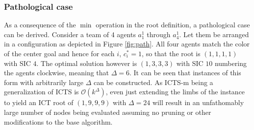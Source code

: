 \documentclass[english]{article}
\begin{document}
	\subsubsection{Pathological case}
	\label{pathology}
	As a consequence of the $\min$ operation in the root definition, a pathological case can be derived. Consider a team of 4 agents $a_1^1$ through $a_4^1$. Let them be arranged in a configuration as depicted in Figure \ref{fig:path}. All four agents match the color of the center goal and hence for each $i$, $c^*_i = 1$, so that the root is $(1,1,1,1)$ with SIC $4$. The optimal solution however is $(1,3,3,3)$ with SIC $10$ numbering the agents clockwise, meaning that $\Delta = 6$. It can be seen that instances of this form with arbitrarily large $\Delta$ can be constructed. As ICTS-m being a generalization of ICTS is $\mathcal{O}(k^\Delta)$, even just extending the limbs of the instance to yield an ICT root of $(1,9,9,9)$ with $\Delta = 24$ will result in an unfathomably large number of nodes being evaluated assuming no pruning or other modifications to the base algorithm.
	
\end{document}

